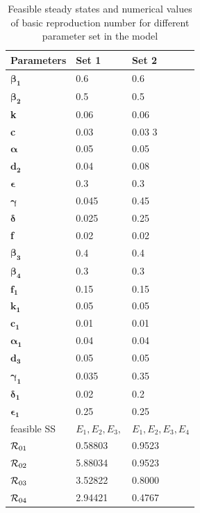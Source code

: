 \documentclass[conference]{IEEEtran}
\begin{document}
\begin{table}
\caption{Feasible steady states and numerical values of basic reproduction number for different parameter set in the model}\label{T1}
\centering
    \begin{tabular}{|p{1.9cm}|p{1.8cm}|p{1.8cm}|}
    \hline
               Parameters      & \textbf{Set 1} & \textbf{Set 2} \\
            \hline
  $\boldsymbol {\beta_{1}} $               & 0.6 & 0.6  \\
  $\boldsymbol {\beta_{2}} $                & 0.5 & 0.5  \\
  \textbf {k}      & 0.06 & 0.06 \\
  \textbf{c}               & 0.03 & 0.03 3\\
  $\boldsymbol{\alpha}$         & 0.05 & 0.05 \\
  $\mathbf {d _{2} }$          & 0.04 & 0.08 \\
  $\boldsymbol{\epsilon}$         & 0.3 & 0.3 \\
  $\boldsymbol{\gamma}$                & 0.045 & 0.45 \\
  $\boldsymbol{\delta}$       & 0.025 & 0.25\\
  \textbf{f}          & 0.02 & 0.02\\
  $\boldsymbol {\beta_{3}}$         & 0.4 & 0.4 \\
  $\boldsymbol {\beta_{4}}$            & 0.3 & 0.3\\
  $\mathbf{f_{1} } $        & 0.15 & 0.15\\
  $\mathbf{k_{1} }  $       & 0.05 & 0.05\\
  $\mathbf{c_{1} } $        & 0.01 & 0.01\\
  $\boldsymbol {\alpha_{1}}$         & 0.04 & 0.04 \\
  $\mathbf{d_{3}}$         & 0.05 & 0.05 \\
  $\boldsymbol {\gamma_{1}}$         & 0.035 & 0.35 \\
  $\boldsymbol {\delta_{1}}$        & 0.02 & 0.2 \\
  $\boldsymbol {\epsilon_{1}}$         & 0.25 & 0.25\\
  \hline
 \multirow{1}{4cm}{\small feasible SS}   &\scriptsize $E_{1},E_{2},E_{3},$ &\scriptsize $E_{1},E_{2},E_{3},E_{4}$ \\
  \hline
  ${{\cal R}}_{01}$ & 0.58803   & 0.9523  \\
  \hline
  ${{\cal R}}_{02}$ & 5.88034   & 0.9523  \\
  \hline
  ${{\cal R}}_{03}$ & 3.52822   & 0.8000 \\
  \hline
  ${{\cal R}}_{04}$ & 2.94421   & 0.4767  \\
  \hline
    \end{tabular}
\end{table}
\end{document}
